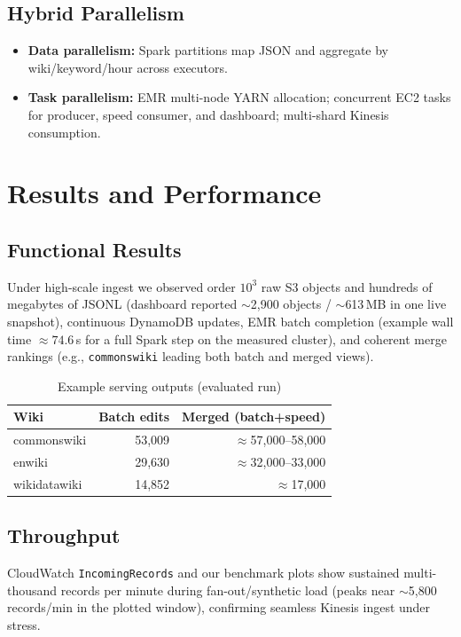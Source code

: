 \documentclass[conference]{IEEEtran}
\begin{document}
\subsection{Hybrid Parallelism}
\begin{itemize}
\item \textbf{Data parallelism:} Spark partitions map JSON and aggregate by wiki/keyword/hour across executors.
\item \textbf{Task parallelism:} EMR multi-node YARN allocation; concurrent EC2 tasks for producer, speed consumer, and dashboard; multi-shard Kinesis consumption.
\end{itemize}

\section{Results and Performance}
\subsection{Functional Results}
Under high-scale ingest we observed order $10^3$ raw S3 objects and hundreds of megabytes of JSONL (dashboard reported $\sim$2{,}900 objects / $\sim$613\,MB in one live snapshot), continuous DynamoDB updates, EMR batch completion (example wall time $\approx 74.6$\,s for a full Spark step on the measured cluster), and coherent merge rankings (e.g., \texttt{commonswiki} leading both batch and merged views).

\begin{table}[t]
\centering
\caption{Example serving outputs (evaluated run)}
\label{tab:results}
\small
\begin{tabular}{@{}lrr@{}}
\toprule
\textbf{Wiki} & \textbf{Batch edits} & \textbf{Merged (batch+speed)} \\
\midrule
commonswiki & 53{,}009 & $\approx$57{,}000--58{,}000 \\
enwiki & 29{,}630 & $\approx$32{,}000--33{,}000 \\
wikidatawiki & 14{,}852 & $\approx$17{,}000 \\
\bottomrule
\end{tabular}
\end{table}

\subsection{Throughput}
CloudWatch \texttt{IncomingRecords} and our benchmark plots show sustained multi-thousand records per minute during fan-out/synthetic load (peaks near $\sim$5{,}800 records/min in the plotted window), confirming seamless Kinesis ingest under stress.
\end{document}
